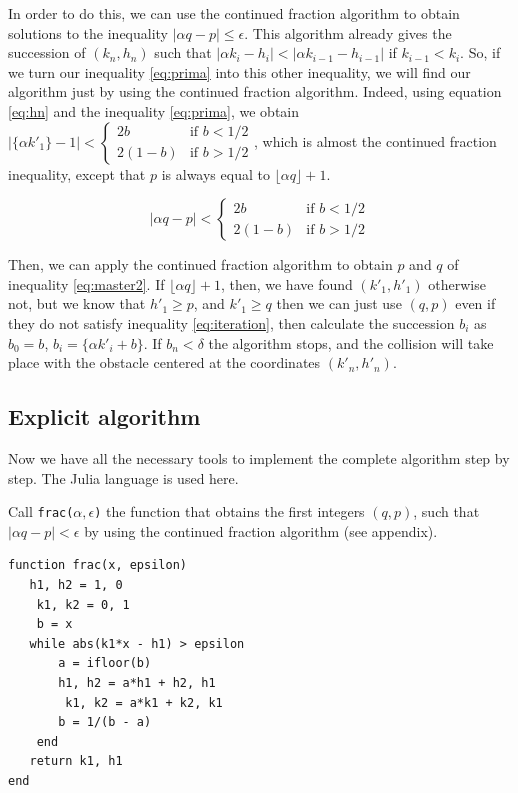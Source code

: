 \documentclass[prl,amsmath,amssymb, twocolumn, showpacs]{revtex4-1}
\begin{document}
In order to do this, we can use the continued fraction algorithm to obtain solutions to the inequality $|\alpha q - p|\leq \epsilon$. This algorithm already gives the succession of $(k_n,h_n)$ such that $|\alpha k_i - h_i|<|\alpha k_{i-1} - h_{i-1}|$ if $k_{i-1} <k_i$. So, if we turn our inequality \ref{eq:prima} into this other inequality, we will find our algorithm just by using the continued fraction algorithm.
Indeed, using equation \ref{eq:hn} and the inequality \ref{eq:prima}, we obtain $|\{ \alpha  k'_1 \} -1|< \begin{cases} 2b &\mbox{if } b < 1/2 \\  2(1-b) & \mbox{if } b > 1/2 \end{cases} $, which is almost the continued fraction inequality, except that $p$ is always equal to $\lfloor \alpha q  \rfloor+1$. 

\begin{equation}
|\alpha  q-p|< \begin{cases} 2b &\mbox{if } b < 1/2 \\  2(1-b) & \mbox{if } b > 1/2 \end{cases}
\label{eq:master2}
\end{equation}

Then, we can apply the continued fraction algorithm to obtain $p$ and $q$ of inequality \ref{eq:master2}. If $\lfloor \alpha q  \rfloor+1$, then, we have found $(k'_1,h'_1)$ otherwise not, but we know that $h'_1\geq p$, and $k'_1 \geq q$ then we can just use $(q,p)$ even if they do not satisfy inequality \ref{eq:iteration}, then calculate the succession $b_i$ as $b_0=b$, $b_i=\{\alpha k'_i+b\}$. If $b_n<\delta$ the algorithm stops, and the collision will take place with the obstacle centered at the coordinates $(k'_n,h'_n)$. 

\subsection{Explicit algorithm}

Now we have all the necessary tools to implement the complete algorithm step by step. The Julia language is used here.

Call \texttt{frac($\alpha, \epsilon$)} the function that obtains the first integers $(q,p)$, such that $|\alpha q-p|<\epsilon$ by using the continued fraction algorithm (see appendix). 

\begin{verbatim}
function frac(x, epsilon) 
   h1, h2 = 1, 0 
    k1, k2 = 0, 1 
    b = x 
   while abs(k1*x - h1) > epsilon 
       a = ifloor(b) 
       h1, h2 = a*h1 + h2, h1 
        k1, k2 = a*k1 + k2, k1 
       b = 1/(b - a) 
    end 
   return k1, h1 
end
\end{verbatim}
\end{document}
